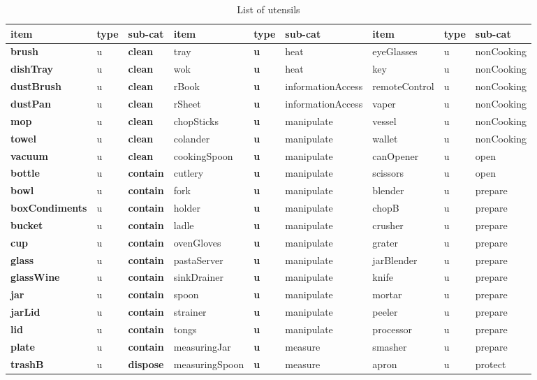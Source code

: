 \documentclass[]{article}
\begin{document}
\begin{table}

\caption{\label{tab:unnamed-chunk-6}List of utensils}
\centering
\begin{tabular}[t]{>{\bfseries}l|l|>{\bfseries}l|l|>{\bfseries}l|l|l|l|l}
\hline
item & type & sub-cat & item & type & sub-cat & item & type & sub-cat\\
\hline
brush & u & clean & tray & u & heat & eyeGlasses & u & nonCooking\\
\hline
dishTray & u & clean & wok & u & heat & key & u & nonCooking\\
\hline
dustBrush & u & clean & rBook & u & informationAccess & remoteControl & u & nonCooking\\
\hline
dustPan & u & clean & rSheet & u & informationAccess & vaper & u & nonCooking\\
\hline
mop & u & clean & chopSticks & u & manipulate & vessel & u & nonCooking\\
\hline
towel & u & clean & colander & u & manipulate & wallet & u & nonCooking\\
\hline
vacuum & u & clean & cookingSpoon & u & manipulate & canOpener & u & open\\
\hline
bottle & u & contain & cutlery & u & manipulate & scissors & u & open\\
\hline
bowl & u & contain & fork & u & manipulate & blender & u & prepare\\
\hline
boxCondiments & u & contain & holder & u & manipulate & chopB & u & prepare\\
\hline
bucket & u & contain & ladle & u & manipulate & crusher & u & prepare\\
\hline
cup & u & contain & ovenGloves & u & manipulate & grater & u & prepare\\
\hline
glass & u & contain & pastaServer & u & manipulate & jarBlender & u & prepare\\
\hline
glassWine & u & contain & sinkDrainer & u & manipulate & knife & u & prepare\\
\hline
jar & u & contain & spoon & u & manipulate & mortar & u & prepare\\
\hline
jarLid & u & contain & strainer & u & manipulate & peeler & u & prepare\\
\hline
lid & u & contain & tongs & u & manipulate & processor & u & prepare\\
\hline
plate & u & contain & measuringJar & u & measure & smasher & u & prepare\\
\hline
trashB & u & dispose & measuringSpoon & u & measure & apron & u & protect\\

\end{tabular}
\end{table}
\end{document}
